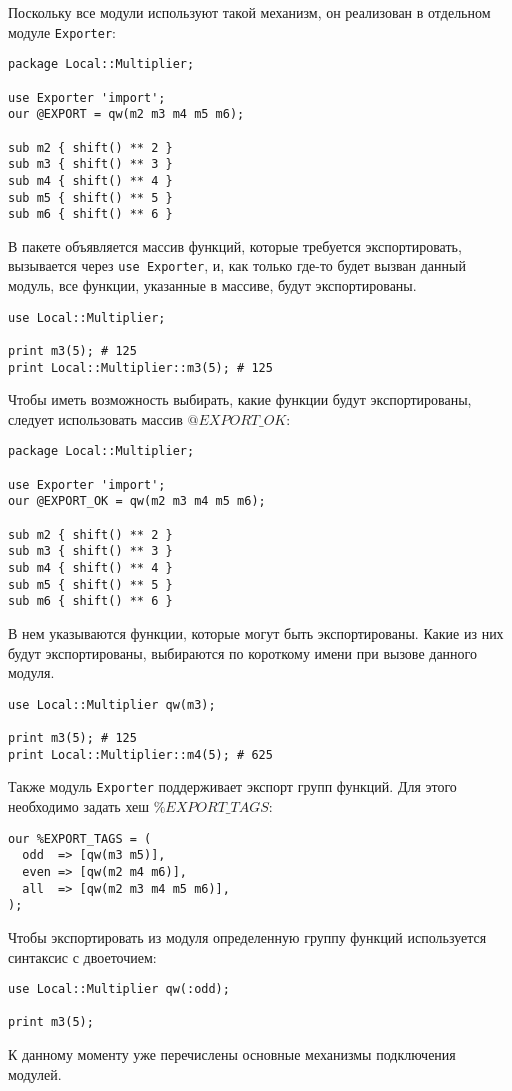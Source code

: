 Поскольку все модули используют такой механизм, он реализован в отдельном модуле \verb|Exporter|:
\begin{verbatim}
package Local::Multiplier;

use Exporter 'import';
our @EXPORT = qw(m2 m3 m4 m5 m6);

sub m2 { shift() ** 2 }
sub m3 { shift() ** 3 }
sub m4 { shift() ** 4 }
sub m5 { shift() ** 5 }
sub m6 { shift() ** 6 }
\end{verbatim}
В пакете объявляется массив функций, которые требуется экспортировать, вызывается через \verb|use Exporter|, и, как только где-то будет вызван данный модуль, все функции, указанные в массиве, будут экспортированы.
\begin{verbatim}
use Local::Multiplier;

print m3(5); # 125
print Local::Multiplier::m3(5); # 125
\end{verbatim}

Чтобы иметь возможность выбирать, какие функции будут экспортированы, следует использовать массив $@EXPORT\_OK$:
\begin{verbatim}
package Local::Multiplier;

use Exporter 'import';
our @EXPORT_OK = qw(m2 m3 m4 m5 m6);

sub m2 { shift() ** 2 }
sub m3 { shift() ** 3 }
sub m4 { shift() ** 4 }
sub m5 { shift() ** 5 }
sub m6 { shift() ** 6 }
\end{verbatim}
В нем указываются функции, которые могут быть экспортированы. Какие из них будут экспортированы, выбираются по короткому имени при вызове данного модуля.
\begin{verbatim}
use Local::Multiplier qw(m3);

print m3(5); # 125
print Local::Multiplier::m4(5); # 625
\end{verbatim}

Также модуль \verb|Exporter| поддерживает экспорт групп функций. Для этого необходимо задать хеш $\%EXPORT\_TAGS$:
\begin{verbatim}
our %EXPORT_TAGS = (
  odd  => [qw(m3 m5)],
  even => [qw(m2 m4 m6)],
  all  => [qw(m2 m3 m4 m5 m6)],
);
\end{verbatim}
Чтобы экспортировать из модуля определенную группу функций используется синтаксис с двоеточием:
\begin{verbatim}
use Local::Multiplier qw(:odd);

print m3(5);
\end{verbatim}
К данному моменту уже перечислены основные механизмы подключения модулей.

